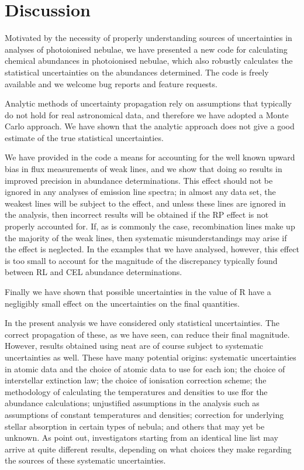 \documentclass[useAMS,usenatbib]{mn2e}
\begin{document}
\section{Discussion}

Motivated by the necessity of properly understanding sources of uncertainties in analyses of photoionised nebulae, we have presented a new code for calculating chemical abundances in photoionised nebulae, which also robustly calculates the statistical uncertainties on the abundances determined.  The code is freely available and we welcome bug reports and feature requests.

Analytic methods of uncertainty propagation rely on assumptions that typically do not hold for real astronomical data, and therefore we have adopted a Monte Carlo approach.  We have shown that the analytic approach does not give a good estimate of the true statistical uncertainties.

We have provided in the code a means for accounting for the well known upward bias in flux measurements of weak lines, and we show that doing so results in improved precision in abundance determinations.  This effect should not be ignored in any analyses of emission line spectra; in almost any data set, the weakest lines will be subject to the effect, and unless these lines are ignored in the analysis, then incorrect results will be obtained if the RP effect is not properly accounted for.  If, as is commonly the case, recombination lines make up the majority of the weak lines, then systematic misunderstandings may arise if the effect is neglected.  In the examples that we have analysed, however, this effect is too small to account for the magnitude of the discrepancy typically found between RL and CEL abundance determinations.

Finally we have shown that possible uncertainties in the value of R have a negligibly small effect on the uncertainties on the final quantities.

In the present analysis we have considered only statistical uncertainties.  The correct propagation of these, as we have seen, can reduce their final magnitude.  However, results obtained using {\sc neat} are of course subject to systematic uncertainties as well.  These have many potential origins: systematic uncertainties in atomic data and the choice of atomic data to use for each ion; the choice of interstellar extinction law; the choice of ionisation correction scheme; the methodology of calculating the temperatures and densities to use ffor the abundance calculations; unjustified assumptions in the analysis such as assumptions of constant temperatures and densities; correction for underlying stellar absorption in certain types of nebula; and others that may yet be unknown.  As \citet{2011arXiv1109.2502K} point out, investigators starting from an identical line list may arrive at quite different results, depending on what choices they make regarding the sources of these systematic uncertainties.
\end{document}
